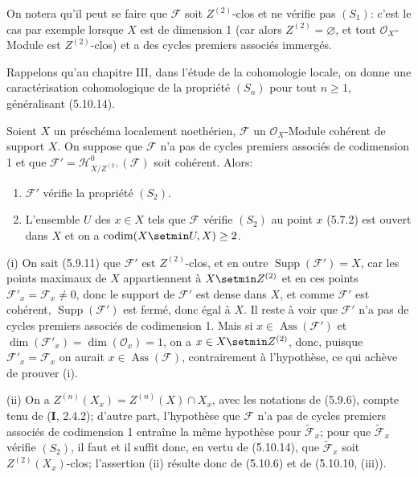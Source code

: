 On notera qu'il peut se faire que $\mathcal F$ soit $Z^{(2)}$-clos et ne
vérifie pas $(S_1)$: c'est le cas par exemple lorsque $X$ est de dimension 1
(car alors $Z^{(2)}=\varnothing$, et tout $\mathcal O_X$-Module est
$Z^{(2)}$-clos) et a des cycles premiers associés immergés.

Rappelons qu'au chapitre III, dans l'étude de la cohomologie locale, on donne
une caractérisation cohomologique de la propriété $(S_n)$ pour tout $n\geq1$,
généralisant (5.10.14).

\begin{corollary}[5.10.15]
\label{IV.2.s5.10.15-fr}
Soient $X$ un préschéma localement noethérien, $\mathcal F$ un
$\mathcal O_X$-Module cohérent de support $X$. On suppose que $\mathcal F$
n'a pas de cycles premiers associés de codimension 1 et que
$\mathcal F'=\mathcal H^0_{X/Z^{(2)}}(\mathcal F)$ soit cohérent. Alors:
\begin{enumerate}
\item[\textup{(i)}] $\mathcal F'$ vérifie la propriété $(S_2)$.


\item[\textup{(ii)}] L'ensemble $U$ des $x\in X$ tels que $\mathcal F$ vérifie $(S_2)$
au point $x$ \textup{(5.7.2)} est ouvert dans $X$ et on a
$\operatorname{codim}(X\setmin U,X)\geq2$.
\end{enumerate}
\end{corollary}

(i) On sait (5.9.11) que $\mathcal F'$ est $Z^{(2)}$-clos, et en outre
$\operatorname{Supp}(\mathcal F')=X$, car les points maximaux de $X$
appartiennent à $X\setmin Z^{(2)}$ et en ces points
$\mathcal F'_x=\mathcal F_x\neq0$, donc le support de $\mathcal F'$ est dense
dans $X$, et comme $\mathcal F'$ est cohérent,
$\operatorname{Supp}(\mathcal F')$ est fermé, donc égal à $X$. Il reste à voir
que $\mathcal F'$ n'a pas de cycles premiers associés de codimension 1. Mais
si $x\in\operatorname{Ass}(\mathcal F')$ et
$\dim(\mathcal F'_x)=\dim(\mathcal O_x)=1$, on a $x\in X\setmin Z^{(2)}$, donc,
puisque $\mathcal F'_x=\mathcal F_x$ on aurait
$x\in\operatorname{Ass}(\mathcal F)$, contrairement à l'hypothèse, ce qui
achève de prouver (i).

(ii) On a $Z^{(n)}(X_x)=Z^{(n)}(X)\cap X_x$, avec les notations de (5.9.6),
compte tenu de (\textbf{I}, 2.4.2); d'autre part, l'hypothèse que $\mathcal F$ n'a pas
de cycles premiers associés de codimension 1 entraîne la même hypothèse pour
$\widetilde{\mathcal F}_x$; pour que $\widetilde{\mathcal F}_x$ vérifie
$(S_2)$, il faut et il suffit donc, en vertu de (5.10.14), que
$\widetilde{\mathcal F}_x$ soit $Z^{(2)}(X_x)$-clos; l'assertion (ii) résulte
donc de (5.10.6) et de (5.10.10, (iii)).

